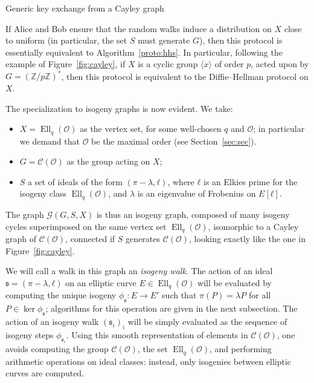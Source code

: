 \documentclass{article}
\newcommand{\Cl}{\mathcal{C}}
\newcommand{\Graph}{\mathcal{G}}
\renewcommand{\O}{\mathcal{O}}
\renewcommand{\frak}{\mathfrak}
\theoremstyle{definition}
\DeclareMathOperator{\Ell}{Ell}
\begin{document}
\begin{algorithm}
  \caption{Generic key exchange from a Cayley graph}
  \label{proto:cayley}
\end{algorithm}

If Alice and Bob ensure that the random walks induce a distribution on
$X$ close to uniform (in particular, the set $S$ must generate $G$),
then this protocol is essentially equivalent to
Algorithm~\ref{proto:hhs}. In particular, following the example of
Figure~\ref{fig:cayley}, if $X$ is a cyclic group $〈x〉$ of order
$p$, acted upon by $G=(ℤ/pℤ)^*$, then this protocol is equivalent to
the Diffie--Hellman protocol on $X$.

The specialization to isogeny graphs is now evident. We take:
\begin{itemize}
\item $X=\Ell_q(\O)$ as the vertex set, for some well-chosen $q$ and $\O$;
in particular we demand that $\O$ be the maximal order (see Section~\ref{sec:sec}).
\item $G=\Cl(\O)$ as the group acting on $X$;
\item $S$ a set of ideals of the form $(π-λ,ℓ)$, where $ℓ$ is an
  Elkies prime for the isogeny class $\Ell_q(\O)$,
  and $λ$ is an eigenvalue of Frobenius on $E[ℓ]$. 
\end{itemize}
The graph $\Graph(G,S,X)$ is thus an isogeny graph, composed of many
isogeny cycles superimposed on the same vertex set $\Ell_q(\O)$,
isomorphic to a Cayley graph of $\Cl(\O)$, connected if $S$ generates
$\Cl(\O)$, looking exactly like the one in Figure~\ref{fig:cayley}.

We will call a walk in this graph an \emph{isogeny walk}. The action of
an ideal $\frak s=(π-λ,ℓ)$ on an elliptic curve $E∈\Ell_q(\O)$ will be
evaluated by computing the unique isogeny $ϕ_{\frak s}:E→E'$ such that
$π(P)=λP$ for all $P∈\ker ϕ_{\frak s}$; algorithms for this operation are given
in the next subsection. The action of an isogeny walk $(\frak s_i)_i$
will be simply evaluated as the sequence of isogeny steps
$ϕ_{\frak s_i}$. Using this smooth representation of elements
in $\Cl(\O)$, one avoids computing the group $\Cl(\O)$,
the set $\Ell_q(\O)$, and performing arithmetic operations on ideal classes:
instead, only isogenies between elliptic curves are computed.
\end{document}

